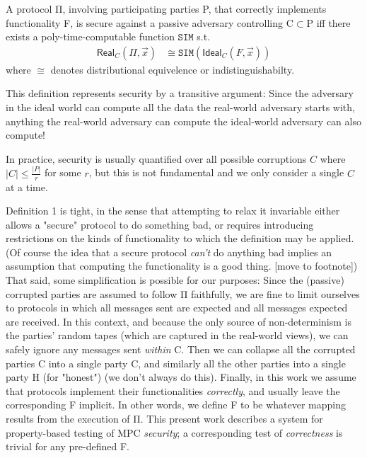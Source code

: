 \documentclass[conference]{IEEEtran}
\begin{document}
\begin{definition}
    A protocol Π,
    involving participating parties P,
    that correctly implements functionality F,
    is secure against a passive adversary controlling C$\subset$P iff
    there exists a poly-time-computable function $\mathtt{SIM}$ s.t.
    $$\begin{aligned}
        \mathsf{Real}_C(Π, \vec{x}) &\cong \mathtt{SIM}(\mathsf{Ideal}_C(F,\vec{x}))
    \end{aligned}$$
    where $\cong$ denotes distributional equivelence or indistinguishabilty.
\end{definition}

This definition represents security by a transitive argument:
Since the adversary in the ideal world can compute all the data the real-world adversary starts with,
anything the real-world adversary can compute the ideal-world adversary can also compute!

In practice, security is usually quantified over all possible corruptions $C$
where $\lvert C \rvert \leq \frac{\lvert P \rvert}{r}$ for some $r$, but this is not fundamental and we only consider a single $C$ at a time.

Definition 1 is tight, in the sense that attempting to relax it invariable either
allows a "secure" protocol to do something bad, or requires introducing restrictions
on the kinds of functionality to which the definition may be applied.
(Of course the idea that a secure protocol \textit{can't} do anything bad implies an assumption that computing
the functionality is a good thing. [move to footnote])
That said, some simplification is possible for our purposes:
Since the (passive) corrupted parties are assumed to follow Π faithfully, we are fine to limit ourselves to
 protocols in which all messages sent are expected and all messages expected are received.
In this context, and because the only source of non-determinism is the parties' random tapes
(which are captured in the real-world views),
we can safely ignore any messages sent \textit{within} C.
Then we can collapse all the corrupted parties C into a single party C,
and similarly all the other parties into a single party H (for "honest")
(we don't always do this).
Finally, in this work we assume that protocols implement their functionalities \textit{correctly},
and usually leave the corresponding F implicit.
In other words, we define F to be whatever mapping results from the execution of Π.
This present work describes a system for property-based testing of MPC \textit{security};
a corresponding test of \textit{correctness} is trivial for any pre-defined F.
\end{document}
